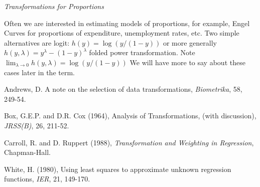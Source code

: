 \documentclass[11pt]{amsbook}
\newcommand{\Ref}[1]{\medskip\noindent\hangafter=1
      \hangindent=20pt\ignorespaces #1}
\begin{document}
\vspace{5mm}
\begin{center}
{\em Transformations for Proportions}
\end{center}

Often we are interested in estimating models of proportions, for example, 
Engel Curves for proportions of expenditure,  unemployment rates, etc.
Two simple alternatives are logit: 
$h(y) = \log (y/(1-y))$  or more generally $ h(y, \lambda) = y^\lambda - 
(1-y)^\lambda$  folded power transformation.
Note $\lim_{\lambda\rightarrow 0} h(y, \lambda) = \log (y/(1-y))$
We will have more to say about these cases later in the term.

\vspace{5mm}

\Ref Andrews, D. A note on the selection of data transformations, 
{\it Biometrika}, 58, 249-54.

\Ref Box, G.E.P. and D.R. Cox (1964),  Analysis of Transformations, (with discussion), {\em JRSS(B)}, 26, 211-52.

\Ref Carroll, R. and D. Ruppert (1988),  {\em Transformation and Weighting in Regression}, Chapman-Hall.

\Ref White, H. (1980), Using least squares to approximate unknown regression 
functions, {\em IER}, 21, 149-170.
\end{document}
